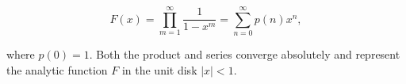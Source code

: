 $$F(x) = \prod_{m=1}^{\infty} \frac{1}{1-x^m} = \sum_{n=0}^{\infty} p(n)x^n,$$

where $p(0) = 1$. Both the product and series converge absolutely and represent the analytic function $F$ in the unit disk $|x| < 1$.

